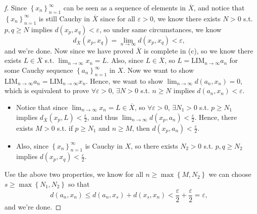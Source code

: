 \begin{proof}[f]
  Since \(\left\{ x_n \right\}_{n=1}^{\infty}  \) can be seen as a sequence of elements in \(\overline{X} \), and notice that \(\left\{ x_n \right\}_{n=1}^{\infty}  \) is still Cauchy in \(\overline{X} \) since for all \(\varepsilon > 0\), we know there exists \(N > 0\) s.t. \(p, q \ge N\) implies \(d(x_p, x_q) < \varepsilon  \), so under same circumstances, we know 
  \[
    d_{\overline{X} }(x_p, x_q) = \lim_{n \to \infty} d(x_p, x_q) < \varepsilon , 
  \] and we're done. Now since we have proved \(\overline{X} \) is complete in (c), so we know there exists \(L \in \overline{X} \) s.t. \(\lim_{n \to \infty} x_n = L \). Also, since \(L \in \overline{X} \), so \(L = \mathrm{LIM}_{n \to \infty }a_n \) for some Cauchy sequence \(\left\{ a_n \right\}_{n=1}^{\infty}  \) in \(X\). Now we want to show \(\mathrm{LIM}_{n \to \infty } a_n = \mathrm{LIM}_{n \to \infty } x_n  \). Hence, we want to show \(\lim_{n \to \infty} d(a_n, x_n) = 0 \), which is equivalent to prove \(\forall \varepsilon > 0\), \(\exists N > 0\) s.t. \(n \ge N\) implies \(d(a_n, x_n) < \varepsilon \). 
  \begin{itemize}
    \item Notice that since \(\lim_{n \to \infty} x_n = L \in \overline{X} \), so \(\forall \varepsilon >0\), \(\exists N_1 > 0\) s.t. \(p \ge N_1\) implies \(d_{\overline{X} }(x_p, L) < \frac{\varepsilon}{2}\), and thus \(\lim_{n \to \infty} d(x_p, a_n) < \frac{\varepsilon}{2} \). Hence, there exists \(M > 0\) s.t. if \(p \ge N_1\) and \(n \ge M\), then \(d(x_p, a_n) < \frac{\varepsilon}{2}\). 
    \item Also, since \(\left\{ x_n \right\}_{n=1}^{\infty}  \) is Cauchy in \(X\), so there exists \(N_2 > 0\) s.t. \(p, q \ge N_2\) implies \(d(x_p, x_q) < \frac{\varepsilon}{2}\).             
  \end{itemize}            
  Use the above two properties, we know for all \(n \ge \max \left\{ M, N_2 \right\} \) we can choose \(s \ge \max \left\{ N_1, N_2 \right\} \) so that 
  \[
    d(a_n, x_n) \le d(a_n, x_s) + d(x_s, x_n) < \frac{\varepsilon}{2} + \frac{\varepsilon}{2} = \varepsilon,
  \] and we're done.
\end{proof}
